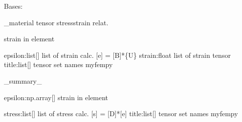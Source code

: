 \documentclass[letterpaper,10pt,english]{sphinxmanual}
\begin{document}
\begin{fulllineitems}
\label{\detokenize{myfempy.felib.materials:myfempy.felib.materials.solid.Tensor}}
\pysigstartsignatures
{}
\pysigstopsignatures
\sphinxAtStartPar
Bases: 

\sphinxAtStartPar
\_material tensor stress\sphinxhyphen{}strain relat.

\begin{fulllineitems}
\label{\detokenize{myfempy.felib.materials:myfempy.felib.materials.solid.Tensor.strain}}
\pysigstartsignatures
{}
\pysigstopsignatures
\sphinxAtStartPar
strain in element
\begin{description}
\sphinxAtStartPar
epsilon:list{[}{]}  \textendash{} list of strain calc. {[}e{]} = {[}B{]}*\{U\}
strain:float    \textendash{} list of strain tensor
title:list{[}{]}    \textendash{} tensor set names myfempy

\end{description}

\end{fulllineitems}


\begin{fulllineitems}
\label{\detokenize{myfempy.felib.materials:myfempy.felib.materials.solid.Tensor.stress}}
\pysigstartsignatures
{}
\pysigstopsignatures
\sphinxAtStartPar
\_summary\_
\begin{description}
\sphinxAtStartPar
epsilon:np.array{[}{]} \textendash{} strain in element

\sphinxAtStartPar
stress:list{[}{]}   \textendash{} list of stress calc. {[}s{]} = {[}D{]}*{[}e{]}
title:list{[}{]}    \textendash{} tensor set names myfempy

\end{description}

\end{fulllineitems}


\end{fulllineitems}
\end{document}
